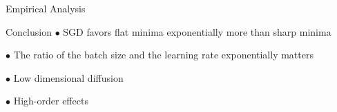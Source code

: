 \documentclass{beamer}
\begin{document}
\begin{frame}{Empirical Analysis}
\begin{figure}
\centering
{} 
\end{figure}
\end{frame}

\begin{frame}{Conclusion}
    $\bullet$ SGD favors flat minima exponentially more than sharp minima 

    $\bullet$ The ratio of the batch size and the learning rate exponentially matters

    $\bullet$ Low dimensional diffusion

    $\bullet$ High-order effects
\end{frame}

%     
%     
\end{document}
